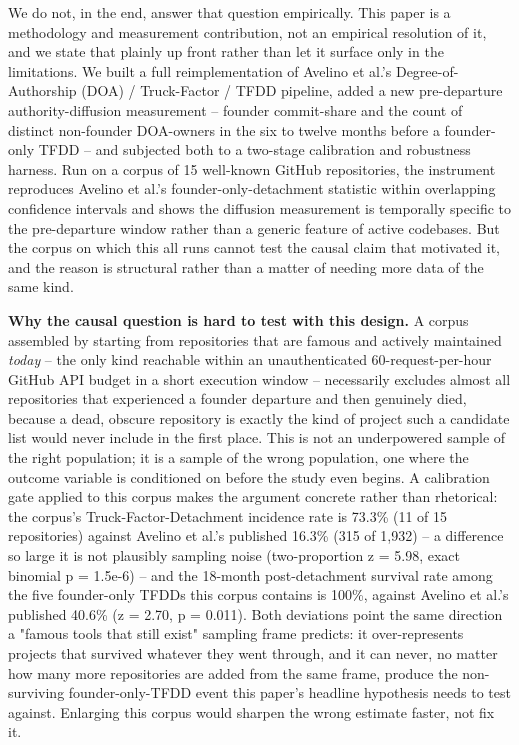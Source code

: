 \documentclass[11pt,letterpaper]{article}
\begin{document}
We do not, in the end, answer that question empirically. This paper is a methodology and measurement contribution, not an empirical resolution of it, and we state that plainly up front rather than let it surface only in the limitations. We built a full reimplementation of Avelino et al.'s Degree-of-Authorship (DOA) / Truck-Factor / TFDD pipeline, added a new pre-departure authority-diffusion measurement -- founder commit-share and the count of distinct non-founder DOA-owners in the six to twelve months before a founder-only TFDD -- and subjected both to a two-stage calibration and robustness harness. Run on a corpus of 15 well-known GitHub repositories, the instrument reproduces Avelino et al.'s founder-only-detachment statistic within overlapping confidence intervals and shows the diffusion measurement is temporally specific to the pre-departure window rather than a generic feature of active codebases. But the corpus on which this all runs cannot test the causal claim that motivated it, and the reason is structural rather than a matter of needing more data of the same kind.

\textbf{Why the causal question is hard to test with this design.} A corpus assembled by starting from repositories that are famous and actively maintained \emph{today} -- the only kind reachable within an unauthenticated 60-request-per-hour GitHub API budget in a short execution window -- necessarily excludes almost all repositories that experienced a founder departure and then genuinely died, because a dead, obscure repository is exactly the kind of project such a candidate list would never include in the first place. This is not an underpowered sample of the right population; it is a sample of the wrong population, one where the outcome variable is conditioned on before the study even begins. A calibration gate applied to this corpus makes the argument concrete rather than rhetorical: the corpus's Truck-Factor-Detachment incidence rate is 73.3\% (11 of 15 repositories) against Avelino et al.'s published 16.3\% (315 of 1,932) -- a difference so large it is not plausibly sampling noise (two-proportion z = 5.98, exact binomial p = 1.5e-6) -- and the 18-month post-detachment survival rate among the five founder-only TFDDs this corpus contains is 100\%, against Avelino et al.'s published 40.6\% (z = 2.70, p = 0.011). Both deviations point the same direction a "famous tools that still exist" sampling frame predicts: it over-represents projects that survived whatever they went through, and it can never, no matter how many more repositories are added from the same frame, produce the non-surviving founder-only-TFDD event this paper's headline hypothesis needs to test against. Enlarging this corpus would sharpen the wrong estimate faster, not fix it.
\end{document}

